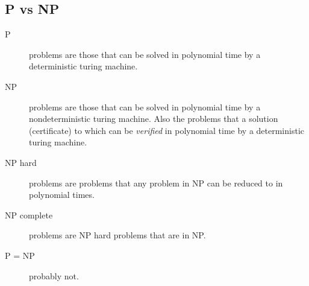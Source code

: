 \documentclass[landscape]{cheat}
\begin{document}
\begin{multicols*}{3}
\section{P vs NP}
\begin{description}
    \item[P] problems are those that can be solved in polynomial time by a deterministic turing machine.
    \item[NP] problems are those that can be solved in polynomial time by a nondeterministic turing machine.
        Also the problems that a solution (certificate) to which can be \emph{verified} in polynomial time by a deterministic turing machine.
    \item[NP hard] problems are problems that any problem in NP can be reduced to in polynomial times.
    \item[NP complete] problems are NP hard problems that are in NP.
    \item[P = NP] probably not.
\end{description}

\end{multicols*}
\end{document}
